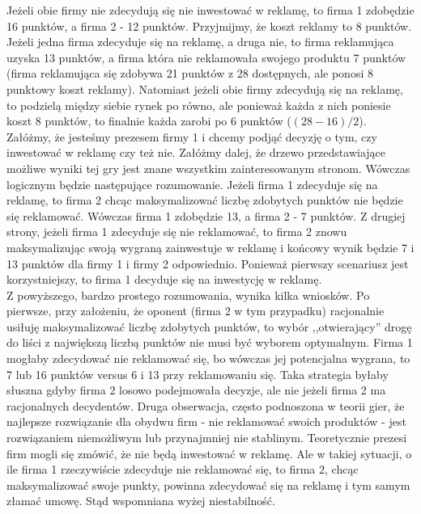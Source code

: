 \documentclass[licencjacka]{pracamgr}
\begin{document}
 Jeżeli obie firmy nie zdecydują się nie inwestować w reklamę, to firma 1 zdobędzie 16 punktów, a firma 2 - 12 punktów. Przyjmijmy, że koszt reklamy to 8 punktów. Jeżeli jedna firma zdecyduje się na reklamę, a druga nie, to firma reklamująca uzyska 13 punktów, a firma która nie reklamowała swojego produktu 7 punktów (firma reklamująca się zdobywa 21 punktów z 28 dostępnych, ale ponosi 8 punktowy koszt reklamy).  Natomiast jeżeli obie firmy zdecydują się na reklamę, to podzielą między siebie rynek po równo, ale ponieważ każda z nich poniesie koszt 8 punktów, to finalnie każda zarobi po 6 punktów ($(28 - 16)/2$).\\
 
 Załóżmy, że jesteśmy prezesem firmy 1 i chcemy podjąć decyzję o tym, czy inwestować w reklamę czy też nie. Załóżmy dalej, że drzewo przedstawiające możliwe wyniki tej gry jest znane wszystkim zainteresowanym stronom. Wówczas logicznym będzie następujące rozumowanie. Jeżeli firma 1 zdecyduje się na reklamę, to firma 2 chcąc maksymalizować liczbę zdobytych punktów nie będzie się reklamować. Wówczas firma 1 zdobędzie 13, a firma 2  - 7 punktów.  Z drugiej strony, jeżeli firma 1 zdecyduje się nie reklamować, to firma 2 znowu maksymalizując swoją wygraną zainwestuje w reklamę i końcowy wynik będzie 7 i 13 punktów dla firmy 1 i firmy 2 odpowiednio.  Ponieważ pierwszy scenariusz jest korzystniejszy, to firma 1 decyduje się na inwestycję w reklamę. \\
 
 Z powyższego, bardzo prostego rozumowania, wynika kilka wniosków. Po pierwsze, przy założeniu, że oponent (firma 2 w tym przypadku) racjonalnie usiłuję maksymalizować liczbę zdobytych punktów, to wybór ,,otwierający'' drogę do liści z największą liczbą punktów nie musi być wyborem optymalnym. Firma 1 mogłaby zdecydować nie reklamować się, bo wówczas jej potencjalna wygrana, to 7 lub 16 punktów versus 6 i 13 przy reklamowaniu się. Taka strategia byłaby słuszna gdyby firma 2 losowo podejmowała decyzje, ale nie jeżeli firma  2 ma racjonalnych decydentów. Druga obserwacja, często podnoszona w teorii gier, że najlepsze rozwiązanie dla obydwu firm - nie reklamować swoich produktów  - jest rozwiązaniem niemożliwym lub przynajmniej nie stablinym. Teoretycznie prezesi firm mogli się zmówić, że nie będą inwestować w reklamę.  Ale w takiej sytuacji, o ile firma 1 rzeczywiście zdecyduje nie reklamować się, to firma 2, chcąc maksymalizować swoje punkty, powinna zdecydować się na reklamę i tym samym złamać umowę. Stąd wspomniana wyżej niestabilność.\\
 
\end{document}
